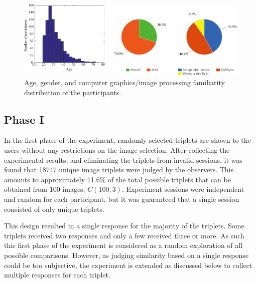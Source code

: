 \begin{figure}
\begin{center}
\includegraphics[width=\textwidth]{figures/chapter3/age_gender_cgi.pdf}
\caption{Age, gender, and computer graphics/image processing familiarity distribution of the participants.
}
\label{fig:age_gender_cgi}
\end{center}
\end{figure}

\subsection{Phase I}
\label{sec:exp_phase_I}
In the first phase of the experiment, randomly selected triplets are shown to the users without any restrictions on the image selection. After collecting the experimental results, and eliminating the triplets from invalid sessions, it was found that 18747 unique image triplets were judged by the observers. This amounts to approximately 11.6\% of the total possible triplets that can be obtained from 100 images, $C(100, 3)$. Experiment sessions were independent and random for each participant, but it was guaranteed that a single session consisted of only unique triplets. 

This design resulted in a single response for the majority of the triplets. Some triplets received two responses and only a few received three or more. As such this first phase of the experiment is considered as a random exploration of all possible comparisons. However, as judging similarity based on a single response could be too subjective, the experiment is extended as discussed below to collect multiple responses for each triplet.

